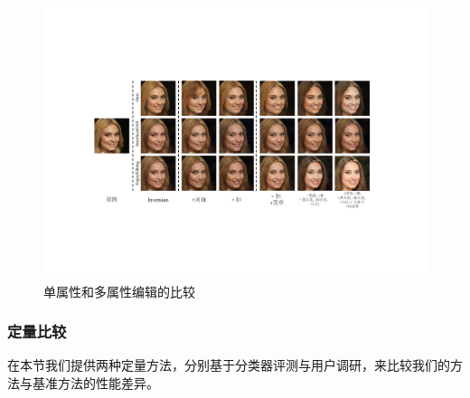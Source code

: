\begin{figure}[!t]
     \begin{center}
        \includegraphics[width=1\linewidth]{figures/ACGAN/FaceMulti_center.pdf}
     \end{center}
     \caption{单属性和多属性编辑的比较}
     \label{fig:face}
\end{figure}

\subsubsection{定量比较}
在本节我们提供两种定量方法，分别基于分类器评测与用户调研，来比较我们的方法与基准方法的性能差异。

